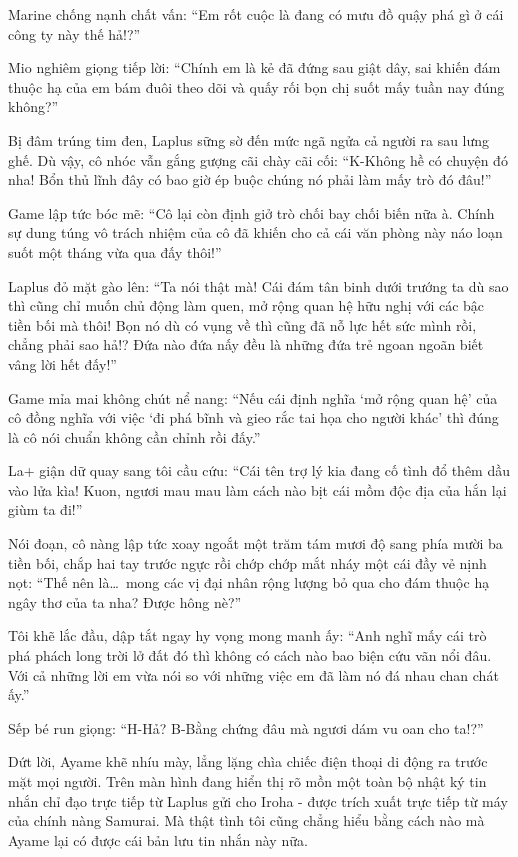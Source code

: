 \documentclass[../main.tex]{subfiles}
\begin{document}

Marine chống nạnh chất vấn: ``Em rốt cuộc là đang có mưu đồ quậy phá gì ở cái công ty này thế hả!?''

Mio nghiêm giọng tiếp lời: ``Chính em là kẻ đã đứng sau giật dây, sai khiến đám thuộc hạ của em bám đuôi theo dõi và quấy rối bọn chị suốt mấy tuần nay đúng không?''

Bị đâm trúng tim đen, Laplus sững sờ đến mức ngã ngửa cả người ra sau lưng ghế. Dù vậy, cô nhóc vẫn gắng gượng cãi chày cãi cối: ``K-Không hề có chuyện đó nha! Bổn thủ lĩnh đây có bao giờ ép buộc chúng nó phải làm mấy trò đó đâu!''

Game lập tức bóc mẽ: ``Cô lại còn định giở trò chối bay chối biến nữa à. Chính sự dung túng vô trách nhiệm của cô đã khiến cho cả cái văn phòng này náo loạn suốt một tháng vừa qua đấy thôi!''

Laplus đỏ mặt gào lên: ``Ta nói thật mà! Cái đám tân binh dưới trướng ta dù sao thì cũng chỉ muốn chủ động làm quen, mở rộng quan hệ hữu nghị với các bậc tiền bối mà thôi! Bọn nó dù có vụng về thì cũng đã nỗ lực hết sức mình rồi, chẳng phải sao hả!? Đứa nào đứa nấy đều là những đứa trẻ ngoan ngoãn biết vâng lời hết đấy!''

Game mỉa mai không chút nể nang: ``Nếu cái định nghĩa `mở rộng quan hệ' của cô đồng nghĩa với việc `đi phá bĩnh và gieo rắc tai họa cho người khác' thì đúng là cô nói chuẩn không cần chỉnh rồi đấy.''

La+ giận dữ quay sang tôi cầu cứu: ``Cái tên trợ lý kia đang cố tình đổ thêm dầu vào lửa kìa! Kuon, ngươi mau mau làm cách nào bịt cái mồm độc địa của hắn lại giùm ta đi!''

Nói đoạn, cô nàng lập tức xoay ngoắt một trăm tám mươi độ sang phía mười ba tiền bối, chắp hai tay trước ngực rồi chớp chớp mắt nháy một cái đầy vẻ nịnh nọt: ``Thế nên là\dots\ mong các vị đại nhân rộng lượng bỏ qua cho đám thuộc hạ ngây thơ của ta nha? Được hông nè?''

Tôi khẽ lắc đầu, dập tắt ngay hy vọng mong manh ấy: ``Anh nghĩ mấy cái trò phá phách long trời lở đất đó thì không có cách nào bao biện cứu vãn nổi đâu. Với cả những lời em vừa nói so với những việc em đã làm nó đá nhau chan chát ấy.''

Sếp bé run giọng: ``H-Hả? B-Bằng chứng đâu mà ngươi dám vu oan cho ta!?''

Dứt lời, Ayame khẽ nhíu mày, lẳng lặng chìa chiếc điện thoại di động ra trước mặt mọi người. Trên màn hình đang hiển thị rõ mồn một toàn bộ nhật ký tin nhắn chỉ đạo trực tiếp từ Laplus gửi cho Iroha - được trích xuất trực tiếp từ máy của chính nàng Samurai. Mà thật tình tôi cũng chẳng hiểu bằng cách nào mà Ayame lại có được cái bản lưu tin nhắn này nữa.
\end{document}
